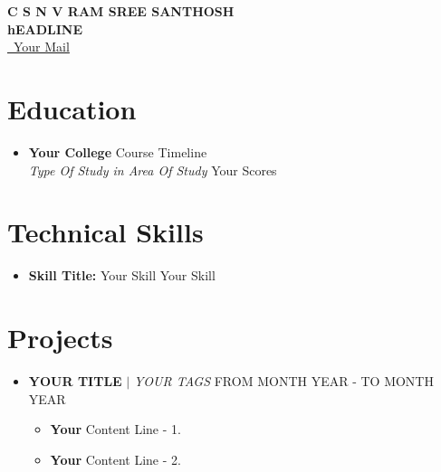 \documentclass[letterpaper,5pt]{article}
\begin{document}
    
    \begin{center}
      \textbf{\Huge \scshape C S N V RAM SREE SANTHOSH} \\ \vspace{5pt}
      \textbf{\large hEADLINE} \\ \vspace{2pt}
      \href{mailto:mail@mail.com}{\raisebox{-0.05\height}\faEnvelope \ Your Mail} 
       \
       \
       \
    \end{center}
    
      
    
    \section{Education}
      
        \begin{itemize}[leftmargin=0.15in, label={}]
        \item[]
            \textbf{Your College} \hfill Course Timeline \\
            \textit{Type Of Study in Area Of Study} \hfill Your Scores
        \end{itemize}
      
      

    
    \section{Technical Skills}
    
        \begin{itemize}[leftmargin=0.15in,label={}]
        \item{
          \textbf{Skill Title: }{\textbullet{} Your Skill \textbullet{} Your Skill \newline}
        }
        \end{itemize}
        \vspace*{-6mm}  
        
    
    \section{Projects}
    
        \begin{itemize}[leftmargin=0.15in,label={}]
          \item{
            \textbf{YOUR TITLE} $|$ \emph{YOUR TAGS}
          }
          \hfill FROM MONTH YEAR - TO MONTH YEAR
          \begin{itemize} 
            \item[\textbullet{}]\textbf{Your} Content Line - 1.
            \item[\textbullet{}]\textbf{Your} Content Line - 2.
          \end{itemize}
          \end{itemize}

        


    
      \ 
    
    
    
    
      
\end{document}
